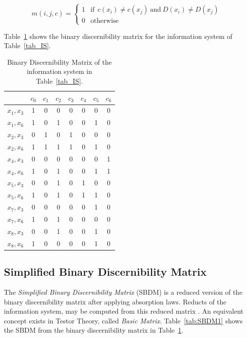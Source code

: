 \documentclass[authoryear,preprint,review,12pt]{elsarticle}
\begin{document}
  \begin{equation}
  	m(i, j, c)=\left\lbrace\begin{array}{cl}
  			1 & \mathrm{if~~}c(x_i) \neq c(x_j) \mathrm{~and~} D(x_i) \neq D(x_j)\\
  			0 								   & \mathrm{otherwise} 
  	\end{array}\right.
  \end{equation} 
  
  Table~\ref{tab_BDM} shows the binary discernibility matrix for the information system of Table~\ref{tab_IS}.  
  
  \begin{table}[htb]
		\caption{Binary Discernibility Matrix of the information system in Table~\ref{tab_IS}.} \label{tab_BDM}
		\centering
 	\begin{tabular}{c|ccccccc}
 		& $c_0$ & $c_1$ & $c_2$ & $c_3$ & $c_4$ & $c_5$ & $c_6$\\
 		\hline
		$x_1,x_3$ & 1 & 0 & 0 & 0 & 0 & 0 & 0 \\
		$x_1,x_6$ & 1 & 0 & 1 & 0 & 0 & 1 & 0 \\
		$x_2,x_3$ & 0 & 1 & 0 & 1 & 0 & 0 & 0 \\
		$x_2,x_6$ & 1 & 1 & 1 & 1 & 0 & 1 & 0 \\
		$x_4,x_3$ & 0 & 0 & 0 & 0 & 0 & 0 & 1 \\
		$x_4,x_6$ & 1 & 0 & 1 & 0 & 0 & 1 & 1 \\
		$x_5,x_3$ & 0 & 0 & 1 & 0 & 1 & 0 & 0 \\
		$x_5,x_6$ & 1 & 0 & 1 & 0 & 1 & 1 & 0 \\
		$x_7,x_3$ & 0 & 0 & 0 & 0 & 0 & 1 & 0 \\
		$x_7,x_6$ & 1 & 0 & 1 & 0 & 0 & 0 & 0 \\
		$x_8,x_3$ & 0 & 0 & 1 & 0 & 0 & 1 & 0 \\
		$x_8,x_6$ & 1 & 0 & 0 & 0 & 0 & 1 & 0 
 	\end{tabular}             
  \end{table}

\subsection{Simplified Binary Discernibility Matrix}\label{sect_SBDM}
  The \textit{Simplified Binary Discernibility Matrix} (SBDM) is a reduced version of the binary discernibility
  matrix after applying absorption laws. Reducts of the information system, may be computed from this reduced matrix \citep{Yao09}. An equivalent concept exists in Testor Theory, called \textit{Basic Matrix}. Table~\ref{tab:SBDM1} shows the SBDM from the binary discernibility matrix in Table~\ref{tab_BDM}.
  
\end{document}
